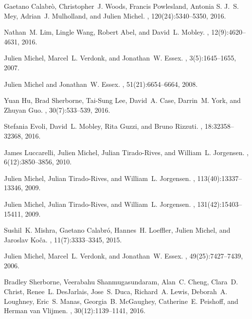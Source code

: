\documentclass{svjour3}                     %
\begin{document}
\begin{thebibliography}{10}
Gaetano Calabrò, Christopher~J. Woods, Francis Powlesland, Antonia S. J.~S.
  Mey, Adrian~J. Mulholland, and Julien Michel.
, 120(24):5340--5350, 2016.

Nathan~M. Lim, Lingle Wang, Robert Abel, and David~L. Mobley.
, 12(9):4620--4631,
  2016.

Julien Michel, Marcel~L. Verdonk, and Jonathan~W. Essex.
, 3(5):1645--1655,
  2007.

Julien Michel and Jonathan~W. Essex.
, 51(21):6654--6664, 2008.

Yuan Hu, Brad Sherborne, Tai-Sung Lee, David~A. Case, Darrin~M. York, and
  Zhuyan Guo.
, 30(7):533--539,
  2016.

Stefania Evoli, David~L. Mobley, Rita Guzzi, and Bruno Rizzuti.
, 18:32358--32368, 2016.

James Luccarelli, Julien Michel, Julian Tirado-Rives, and William~L. Jorgensen.
, 6(12):3850--3856,
  2010.

Julien Michel, Julian Tirado-Rives, and William~L. Jorgensen.
, 113(40):13337--13346,
  2009.

Julien Michel, Julian Tirado-Rives, and William~L. Jorgensen.
, 131(42):15403--15411,
  2009.

Sushil~K. Mishra, Gaetano Calabró, Hannes~H. Loeffler, Julien Michel, and
  Jaroslav Koča.
, 11(7):3333--3345, 2015.

Julien Michel, Marcel~L. Verdonk, and Jonathan~W. Essex.
, 49(25):7427--7439, 2006.

Bradley Sherborne, Veerabahu Shanmugasundaram, Alan~C. Cheng, Clara~D. Christ,
  Renee~L. DesJarlais, Jose~S. Duca, Richard~A. Lewis, Deborah~A. Loughney,
  Eric~S. Manas, Georgia~B. McGaughey, Catherine~E. Peishoff, and Herman van
  Vlijmen.
, 30(12):1139--1141,
  2016.


\end{thebibliography}
\end{document}
